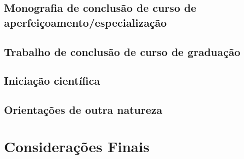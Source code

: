 

\subsection{Monografia de conclusão de curso de aperfeiçoamento/especialização}



\subsection{Trabalho de conclusão de curso de graduação}



\subsection{Iniciação científica}



\subsection{Orientações de outra natureza}



\section{Considerações Finais}
